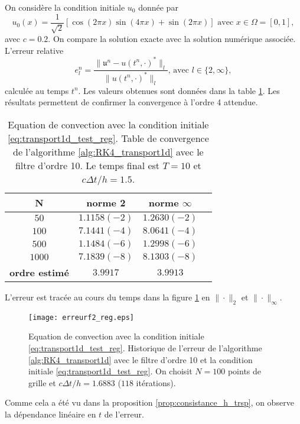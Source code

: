 On considère la condition initiale $u_0$ donnée par 
\begin{equation}
u_0(x) = \dfrac{1}{\sqrt{2}} \left[ \cos (2 \pi x) \sin (4 \pi x) + \sin ( 2 \pi x ) \right] \text{ avec } x \in \Omega = [0,1],
\label{eq:transport1d_test_reg}
\end{equation}
avec $c=0.2$. On compare la solution exacte avec la solution numérique associée. L'erreur relative
\begin{equation}
e_l^n = \dfrac{\| \mathfrak{u}^n - u(t^n,\cdot)^* \|_l}{\| u(t^n, \cdot)^* \|_l} \text{, avec } l \in \lbrace 2, \infty \rbrace,
\end{equation}
calculée au temps $t^n$. Les valeurs obtenues sont données dans la table \ref{tab:rate_transport1d_test_reg}. Les résultats permettent de confirmer la convergence à l'ordre 4 attendue.
\begin{table}[htbp]
\begin{center}
\begin{tabular}{|c||c|c|c|}
\hline
\textbf{N}  & \textbf{norme 2} & \textbf{norme $\infty$} \\
\hline
\hline
$50$   & $1.1158(-2)$  & $1.2630(-2)$  \\
$100$  & $7.1441(-4)$  & $8.0641(-4)$  \\
$500$  & $1.1484(-6)$  & $1.2998(-6)$  \\
$1000$ & $7.1839(-8)$  & $8.1303(-8)$  \\
\hline 
\hline
\textbf{ordre estimé}& $3.9917$ & $3.9913$\\
\hline
\end{tabular}
\end{center}
\caption{Equation de convection avec la condition initiale \eqref{eq:transport1d_test_reg}. Table de convergence de l'algorithme \ref{alg:RK4_transport1d} avec le filtre d'ordre 10. Le temps final est $T=10$ et $c \Delta t/h=1.5$.}
\label{tab:rate_transport1d_test_reg}
\end{table} 
L'erreur est tracée au cours du temps dans la figure \ref{fig:transport1d_test_reg} en $\| \cdot \|_2$ et $\| \cdot \|_{\infty}$.
\begin{figure}[htbp]
\begin{center}
\texttt{[image: erreurf2\_reg.eps]}
\end{center}
\caption{Equation de convection avec la condition initiale \eqref{eq:transport1d_test_reg}. Historique de l'erreur de l'algorithme \ref{alg:RK4_transport1d} avec le filtre d'ordre 10 et la condition initiale \eqref{eq:transport1d_test_reg}. On choisit $N=100$ points de grille et $c \Delta t/h = 1.6883$ ($118$ itérations).}
\label{fig:transport1d_test_reg}
\end{figure}
Comme cela a été vu dans la proposition \ref{prop:consistance_h_trsp}, on observe la dépendance linéaire en $t$ de l'erreur.









